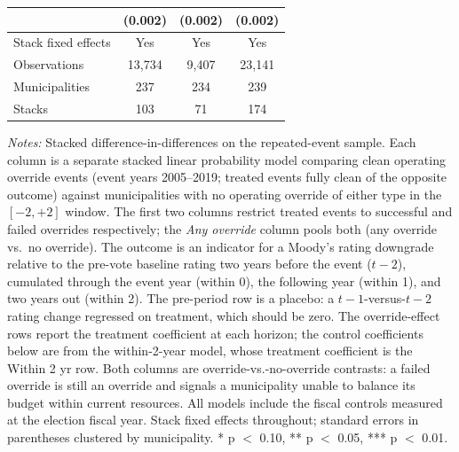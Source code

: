 \begin{table}[!htbp]
\begin{tabular}{lccc}
 & (0.002) & (0.002) & (0.002) \\
\midrule
Stack fixed effects & Yes & Yes & Yes \\
Observations & 13,734 & 9,407 & 23,141 \\
Municipalities & 237 & 234 & 239 \\
Stacks & 103 & 71 & 174 \\
\bottomrule
\end{tabular}
\vspace{0.05in}
\begin{minipage}{0.96\textwidth}\footnotesize\emph{Notes:} Stacked difference-in-differences on the repeated-event sample. Each column is a separate stacked linear probability model comparing clean operating override events (event years 2005--2019; treated events fully clean of the opposite outcome) against municipalities with no operating override of either type in the $[-2,+2]$ window. The first two columns restrict treated events to successful and failed overrides respectively; the \emph{Any override} column pools both (any override vs.\ no override). The outcome is an indicator for a Moody's rating downgrade relative to the pre-vote baseline rating two years before the event ($t-2$), cumulated through the event year (within 0), the following year (within 1), and two years out (within 2). The pre-period row is a placebo: a $t-1$-versus-$t-2$ rating change regressed on treatment, which should be zero. The override-effect rows report the treatment coefficient at each horizon; the control coefficients below are from the within-2-year model, whose treatment coefficient is the Within 2 yr row. Both columns are override-vs.-no-override contrasts: a failed override is still an override and signals a municipality unable to balance its budget within current resources. All models include the fiscal controls measured at the election fiscal year. Stack fixed effects throughout; standard errors in parentheses clustered by municipality. * p $<$ 0.10, ** p $<$ 0.05, *** p $<$ 0.01.\end{minipage}
\end{table}
